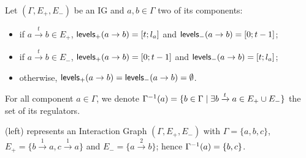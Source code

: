\begin{definition}\label{def:levels}
Let $(\Gamma,E_+,E_-)$ be an IG and $a, b \in \Gamma$ two of its components:
\begin{itemize}
  \item if $a \xrightarrow{t} b \in E_+$, $\mathsf{levels}_+(a\rightarrow b) = [t; l_a]$ and
    $\mathsf{levels}_-(a\rightarrow b) = [0; t-1]$;
  \item if $a \xrightarrow{t} b \in E_-$, $\mathsf{levels}_+(a\rightarrow b) = [0; t-1]$ and
    $\mathsf{levels}_-(a\rightarrow b) = [t; l_a]$;
  \item otherwise, $\mathsf{levels}_+(a\rightarrow b) = \mathsf{levels}_-(a\rightarrow b) = \emptyset$.
\end{itemize}
\end{definition}

For all component $a \in \Gamma$, we denote
$\Gamma^{-1}(a) = \{ b\in\Gamma\mid \exists b\xrightarrow t a\in E_+\cup E_- \}$
the set of its regulators.

\begin{example*}
(left) represents an Interaction Graph $(\Gamma,E_+,E_-)$ with
$\Gamma = \{a, b, c\}$,
$E_+ = \{b \xrightarrow{1} a, c \xrightarrow{1} a\}$ and
$E_- = \{a \xrightarrow{2} b\}$;
hence $\Gamma^{-1}(a) = \{b, c\}$.
\end{example*}

